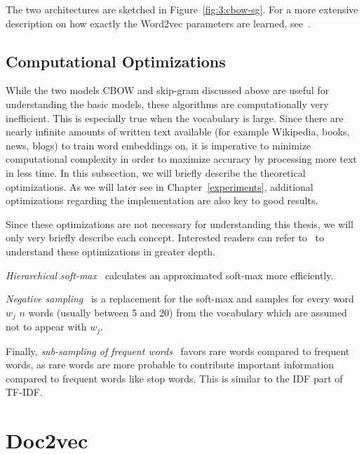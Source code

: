 The two architectures are sketched in Figure~\ref{fig:3:cbow-sg}. For a more extensive description on how exactly the Word2vec parameters are learned, see~\cite{Mikolov2013a, Mikolov2013, TomasMikolov, Rong2014, Goldberg2014a}.

\subsection{Computational Optimizations}

While the two models CBOW and skip-gram discussed above are useful for understanding the basic models, these algorithms are computationally very inefficient. This is especially true when the vocabulary is large. Since there are nearly infinite amounts of written text available (for example Wikipedia, books, news, blogs) to train word embeddings on, it is imperative to minimize computational complexity in order to maximize accuracy by processing more text in less time. In this subsection, we will briefly describe the theoretical optimizations. As we will later see in Chapter~\ref{experiments}, additional optimizations regarding the implementation are also key to good results.

Since these optimizations are not necessary for understanding this thesis, we will only very briefly describe each concept. Interested readers can refer to~\cite{Mikolov2013, Rong2014, Goldberg2014a} to understand these optimizations in greater depth.

\emph{Hierarchical soft-max}~\cite{Morin2005, Mnih2009} calculates an approximated soft-max more efficiently.

\emph{Negative sampling}~\cite{Mikolov2013, Goldberg2014a} is a replacement for the soft-max and samples for every word $w_{j}$ $n$ words (usually between 5 and 20) from the vocabulary which are assumed not to appear with $w_{j}$.

Finally, \emph{sub-sampling of frequent words}~\cite{Mikolov2013} favors rare words compared to frequent words, as rare words are more probable to contribute important information compared to frequent words like stop words. This is similar to the IDF part of TF-IDF\@.

\section{Doc2vec}

